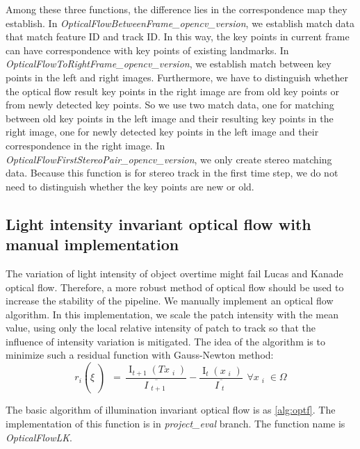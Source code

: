 \documentclass{easychair}
\begin{document}
Among these three functions, the difference lies in the correspondence map they establish. In \emph{OpticalFlowBetweenFrame\_opencv\_version}, we establish match data that match feature ID and track ID. In this way, the key points in current frame can have correspondence with key points of existing landmarks. In \emph{OpticalFlowToRightFrame\_opencv\_version}, we establish match between key points in the left and right images. Furthermore, we have to distinguish whether the optical flow result key points in the right image are from old key points or from newly detected key points. So we use two match data, one for matching between old key points in the left image and their resulting key points in the right image, one for newly detected key points in the left image and their correspondence in the right image. In \emph{OpticalFlowFirstStereoPair\_opencv\_version}, we only create stereo matching data. Because this function is for stereo track in the first time step, we do not need to distinguish whether the key points are new or old.

\subsection{Light intensity invariant optical flow with manual implementation}
The variation of light intensity of object overtime might fail Lucas and Kanade optical flow. Therefore, a more robust method of optical flow should be used to increase the stability of the pipeline. We manually implement an optical flow algorithm. In this implementation, we scale the patch intensity with the mean value, using only the local relative intensity of patch to track so that the influence of intensity variation is mitigated. The idea of the algorithm is to minimize such a residual function with Gauss-Newton method\cite{basalt}:\\

\[{{r_i \left(  \xi  \left) \text{ }=\text{ }\frac{{\mathop{{I}}\nolimits_{{t+1}} \left( Tx\mathop{{}}\nolimits_{{i}} \right) }}{{ \overline {I\mathop{{}}\nolimits_{{t+1}}}}}\right. \right. }-\frac{{\mathop{{I}}\nolimits_{{t}} \left( x\mathop{{}}\nolimits_{{i}} \right) }}{{ \overline {I\mathop{{}}\nolimits_{{t}}}}}\text{ }\text{ } \forall x\mathop{{}}\nolimits_{{i}} \in  \Omega }\]

The basic algorithm of illumination invariant optical flow is as \ref{alg:optf}. The implementation of this function is in \emph{project\_eval} branch. The function name is \emph{OpticalFlowLK}.
\end{document}
